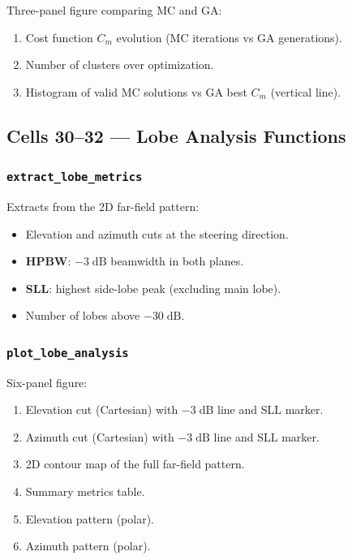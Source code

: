 \documentclass[11pt,a4paper]{article}
\begin{document}
Three-panel figure comparing MC and GA:
\begin{enumerate}
    \item Cost function $C_m$ evolution (MC iterations vs GA generations).
    \item Number of clusters over optimization.
    \item Histogram of valid MC solutions vs GA best $C_m$ (vertical line).
\end{enumerate}

\subsection{Cells 30--32 --- Lobe Analysis Functions}
\label{sec:lobe}

\subsubsection{\texttt{extract\_lobe\_metrics}}
Extracts from the 2D far-field pattern:
\begin{itemize}
    \item Elevation and azimuth cuts at the steering direction.
    \item \textbf{HPBW}: $-3\;\text{dB}$ beamwidth in both planes.
    \item \textbf{SLL}: highest side-lobe peak (excluding main lobe).
    \item Number of lobes above $-30\;\text{dB}$.
\end{itemize}

\subsubsection{\texttt{plot\_lobe\_analysis}}
Six-panel figure:
\begin{enumerate}
    \item Elevation cut (Cartesian) with $-3\;\text{dB}$ line and SLL marker.
    \item Azimuth cut (Cartesian) with $-3\;\text{dB}$ line and SLL marker.
    \item 2D contour map of the full far-field pattern.
    \item Summary metrics table.
    \item Elevation pattern (polar).
    \item Azimuth pattern (polar).
\end{enumerate}
\end{document}
